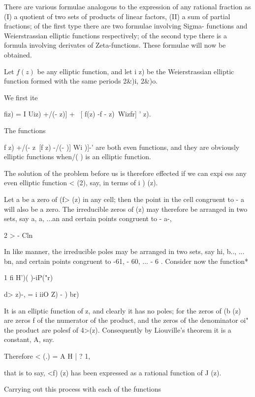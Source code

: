 {There are various formulae analogous to the expression of any rational
fraction as (I) a quotient of two sets of products of linear factors,
(II) a sum of partial fractions; of the first type there are two
formulae involving Sigma- functions and Weierstrassian elliptic
functions respectively; of the second type there is a formula
involving derivates of Zeta-functions. These formulae will now be
obtained.


Let $f(z)$ be any elliptic function, and let i z) be the Weierstrassian
elliptic function formed with the same periods 2\&)i, 2\&)o.

We first ite

fiz) = I Uiz) +/(- z)] + \ [ f(z) -f - z)\ Wizfr] ' z).

%
%

The functions

f z) +/(- z\ [f z) -/(- )] Wi )]-' are both even functions, and they
are obviously elliptic functions when/( ) is an elliptic function.

The solution of the problem before us is therefore effected if we can
expi ess any even elliptic function < (2), say, in terms of i ) (z).

Let a be a zero of (f> (z) in any cell; then the point in the cell
congruent to - a will also be a zero. The irreducible zeros of (z) may
therefore be arranged in two sets, say a, a, ...an and certain
points congruent to - a-,

 2 >    - Cln 

In like manner, the irreducible poles may be arranged in two sets, say
hi, b.., ... bn, and certain points congruent to -61, - 60, ... - 6 .
Consider now the function*

1 fi H')( )-iP("r)

d> z)-, = i iiO Z) - ) br)

It is an elliptic function of z, and clearly it has no poles; for the
zeros of (b (z) are zeros f of the numerator of the product, and the
zeros of the denominator oi" the product are polesf of 4>(z).
Consequently by Liouville's theorem it is a constant, A, say.

Therefore < (.) = A H | ? 1,

that is to say, <f) (z) has been expressed as a rational function of J
(z).

Carrying out this process with each of the functions

}

